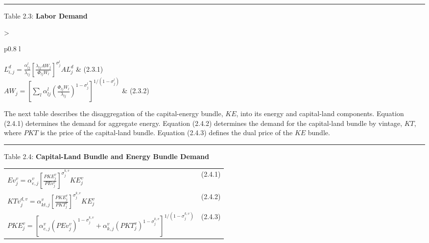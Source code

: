 \documentclass[12pt]{article}
\begin{document}
\noindent\rule{\linewidth}{0.4pt}
\begin{center}
\begin{large}
{\centering Table 2.3: \textbf{Labor Demand
} \par}

\begin{tabular}{>{\raggedright}p{0.8\textwidth} l}

$L^d_{i,j} = \frac{\alpha^l_{lj}}{\lambda_{lj}} \left[\frac{\lambda_{lj}AW_j}{\Phi_{lj}W_l}\right]^{\sigma^l_j} AL^d_j$ & (2.3.1)\\[15pt]

$AW_j = \left[\displaystyle \sum_l \alpha^l_{lj} \left(\frac{\Phi_{lj}W_l}{\lambda_{lj}}\right)^{1-{\sigma^l_j}} \right]^{1/(1-{\sigma^l_j})}$ & (2.3.2)\\[15pt]

\hline
\end{tabular}
\end{large}
\end{center}


The next table describes the disaggregation of the capital-energy bundle, $KE$, into its energy and capital-land components. Equation (2.4.1) determines the demand for aggregate energy. Equation (2.4.2) determines the demand for the capital-land bundle by vintage, $KT$, where $PKT$ is the price of the capital-land bundle. Equation (2.4.3) defines the dual price of the $KE$ bundle.

\newpage

\noindent\rule{\linewidth}{0.4pt}
\begin{center}
\begin{large}

{\centering Table 2.4: \textbf{Capital-Land Bundle and Energy Bundle Demand
} \par}

\begin{tabular}{>{\raggedright}p{} l}

$Ev^v_j = \alpha^v_{e,j} \left[\frac {PKE^v_j} {PEv^v_j} \right]^{\sigma^{k,v}_j} KE^v_j$ & (2.4.1)\\

$KTv^{d,v}_j = \alpha^v_{kt,j} \left[\frac {PKE^v_j} {PKT^v_j} \right]^{\sigma^{k,v}_j} K\!E^v_j$ & (2.4.2)\\

{\normalsize$PKE^v_j = \left [\alpha^v_{e,j} \left(PEv^v_j \right)^{1-{\sigma^{k,v}_j}} + \alpha^v_{k,j} \left(PKT^v_j \right)^{1-{\sigma^{k,v}_j}}\right]^{1/(1-{\sigma^{k,v}_j})} $} & (2.4.3)\\[15pt]

\hline
\end{tabular}
\end{large}
\end{center}
\end{document}

